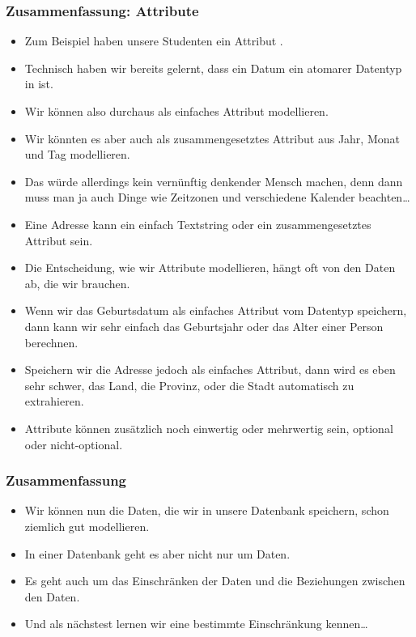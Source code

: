\documentclass[aspectratio=169,mathserif,notheorems]{beamer}%
\begin{document}
\begin{frame}%
\frametitle{Zusammenfassung: Attribute}%
\begin{itemize}%
%
%
%
%
%
%
%
%
\item<7-> Zum Beispiel haben unsere Studenten ein Attribut .%
\item<8-> Technisch haben wir bereits gelernt, dass ein Datum ein atomarer Datentyp in  ist.%
%
\item<9-> Wir können  also durchaus als einfaches Attribut modellieren.%
%
\item<10-> Wir könnten es aber auch als zusammengesetztes Attribut aus Jahr, Monat und Tag modellieren.%
%
\item<11-> Das würde allerdings kein vernünftig denkender Mensch machen, denn dann muss man ja auch Dinge wie Zeitzonen und verschiedene Kalender beachten\dots%
%
\item<12-> Eine Adresse kann ein einfach Textstring oder ein zusammengesetztes Attribut sein.%
%
\item<13-> Die Entscheidung, wie wir Attribute modellieren, hängt oft von den Daten ab, die wir brauchen.%
%
\item<14-> Wenn wir das Geburtsdatum als einfaches Attribut vom Datentyp  speichern, dann kann wir sehr einfach das Geburtsjahr oder das Alter einer Person berechnen.%
%
\item<15-> Speichern wir die Adresse jedoch als einfaches Attribut, dann wird es eben sehr schwer, das Land, die Provinz, oder die Stadt automatisch zu extrahieren.%
%
\item<16-> Attribute können zusätzlich noch einwertig oder mehrwertig sein, optional oder nicht-optional.%
\end{itemize}%
\end{frame}%
%
\begin{frame}%
\frametitle{Zusammenfassung}%
\begin{itemize}%
\item Wir können nun die Daten, die wir in unsere Datenbank speichern, schon ziemlich gut modellieren.%
%
\item<2-> In einer Datenbank geht es aber nicht nur um Daten.%
%
\item<3-> Es geht auch um das Einschränken der Daten und die Beziehungen zwischen den Daten.%
%
\item<4-> Und als nächstest lernen wir eine bestimmte Einschränkung kennen\dots%
\end{itemize}%
\end{frame}%
%
\endPresentation%
\end{document}
